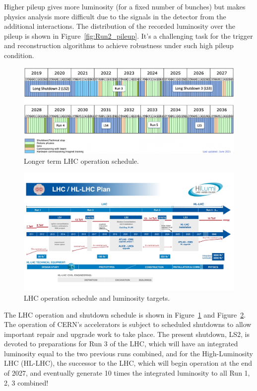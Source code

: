 \documentclass[letterpaper,12pt]{article}
\begin{document}
	Higher pileup gives more luminosity (for a fixed number of bunches) 
	but makes physics analysis more difficult due to the signals in the detector 
	from the additional interactions. The distribution of the recorded luminosity over
	the pileup is shown in Figure~\ref{fig:Run2_pileup}. It's a challenging task for the 
	trigger and reconstruction algorithms to achieve robustness under such high pileup 
	condition.

	\begin{figure}[bht]
		\begin{centering}	
		\includegraphics[width=.8\textwidth]{Detector_plots/LHC-longterm-schedule.png}
		\caption{Longer term LHC operation schedule.%
			}
		\label{fig:LHC-longterm-schedule}
		\end{centering}
	\end{figure}
	
	\begin{figure}[bht]
		\begin{centering}
		\includegraphics[width=.65\textwidth]{Detector_plots/LHC-schedule-lumi.jpg}
		\caption{LHC operation schedule and luminosity targets.  %
			}
		\label{fig:LHC-schedule-lumi}
		\end{centering}
	\end{figure}
	The LHC operation and shutdown schedule is shown 
	in Figure~\ref{fig:LHC-longterm-schedule}
	and Figure~\ref{fig:LHC-schedule-lumi}.
	The operation of CERN’s accelerators is subject to scheduled shutdowns 
	to allow important repair and upgrade work to take place. 
	The present shutdown, LS2, is devoted to preparations for Run 3 of the LHC, 
	which will have an integrated luminosity equal to the two previous runs combined, 
	and for the High-Luminosity LHC (HL-LHC), 
	the successor to the LHC, which will begin operation at the end of 2027,
	and eventually generate 10 times the integrated luminosity to
	all Run 1, 2, 3 combined!
	
\end{document}
